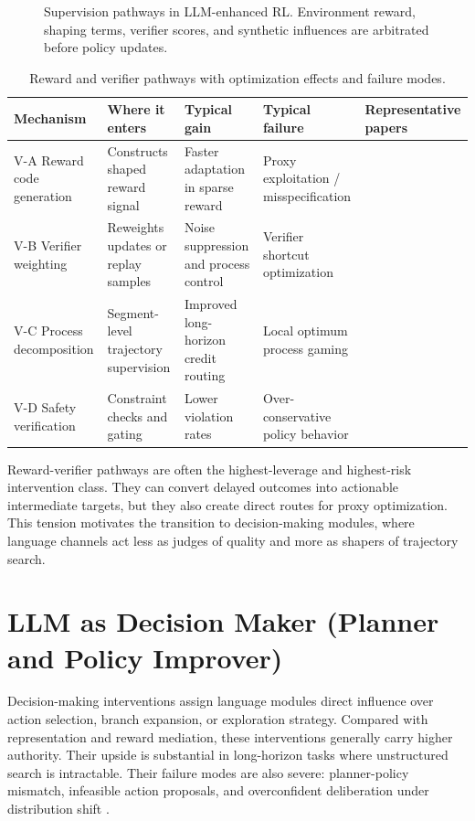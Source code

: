 \documentclass[pdflatex,sn-mathphys-num]{sn-jnl}
\begin{document}
\begin{figure}[t]
\centering
\resizebox{0.95\textwidth}{!}{}
\caption{Supervision pathways in LLM-enhanced RL. Environment reward, shaping terms, verifier scores, and synthetic influences are arbitrated before policy updates.}
\label{fig:supervision}
\end{figure}

\begin{table}[t]
\centering
\small
\setlength{\tabcolsep}{4pt}
\begin{tabularx}{\textwidth}{P{2.2cm}P{2.8cm}P{2.0cm}P{2.2cm}Y}
\toprule
\textbf{Mechanism} & \textbf{Where it enters} & \textbf{Typical gain} & \textbf{Typical failure} & \textbf{Representative papers}\\
\midrule
V-A Reward code generation & Constructs shaped reward signal & Faster adaptation in sparse reward & Proxy exploitation / misspecification & \cite{arxiv_p_2310_12931,arxiv_p_2309_06687,arxiv_p_2309_11489}\\
V-B Verifier weighting & Reweights updates or replay samples & Noise suppression and process control & Verifier shortcut optimization & \cite{arxiv_p_2602_06493,arxiv_p_2602_12579,arxiv_p_2602_02395}\\
V-C Process decomposition & Segment-level trajectory supervision & Improved long-horizon credit routing & Local optimum process gaming & \cite{arxiv_p_2510_20867,doi_p_10_48448_0js4_fm43,arxiv_p_2602_11551}\\
V-D Safety verification & Constraint checks and gating & Lower violation rates & Over-conservative policy behavior & \cite{arxiv_p_2512_05686,arxiv_p_2602_09367,arxiv_p_2602_13156}\\
\bottomrule
\end{tabularx}
\caption{Reward and verifier pathways with optimization effects and failure modes.}
\label{tab:t2_reward}
\end{table}

Reward-verifier pathways are often the highest-leverage and highest-risk intervention class. They can convert delayed outcomes into actionable intermediate targets, but they also create direct routes for proxy optimization. This tension motivates the transition to decision-making modules, where language channels act less as judges of quality and more as shapers of trajectory search.
\section{LLM as Decision Maker (Planner and Policy Improver)}
Decision-making interventions assign language modules direct influence over action selection, branch expansion, or exploration strategy. Compared with representation and reward mediation, these interventions generally carry higher authority. Their upside is substantial in long-horizon tasks where unstructured search is intractable. Their failure modes are also severe: planner-policy mismatch, infeasible action proposals, and overconfident deliberation under distribution shift \cite{arxiv_p_2204_01691,arxiv_p_2305_16291,arxiv_p_2405_01534,arxiv_p_2602_16165,arxiv_p_2602_07848,arxiv_p_2602_11551,arxiv_p_2512_16848}.
\end{document}
